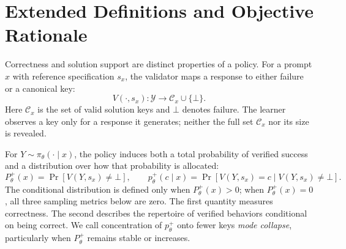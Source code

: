 \long{}

\section{Extended Definitions and Objective Rationale}
\label{app:metrics}

Correctness and solution support are distinct properties of a policy. For a
prompt $x$ with reference specification $s_x$, the validator maps a response
to either failure or a canonical key:
\[
  V(\cdot,s_x):\mathcal Y\rightarrow \mathcal C_x\cup\{\bot\}.
\]
Here $\mathcal C_x$ is the set of valid solution keys and $\bot$ denotes
failure. The learner observes a key only for a response it generates; neither
the full set $\mathcal C_x$ nor its size is revealed.

For $Y\sim\pi_\theta(\cdot\mid x)$, the policy induces both a total probability
of verified success and a distribution over how that probability is allocated:
\[
 P_\theta^+(x)=\Pr[V(Y,s_x)\neq\bot],
 \qquad
 p_\theta^+(c\mid x)=\Pr[V(Y,s_x)=c\mid V(Y,s_x)\neq\bot].
\]
The conditional distribution is defined only when $P_\theta^+(x)>0$;
when $P_\theta^+(x)=0$, all three sampling metrics below are zero.
The first quantity measures correctness. The second describes the repertoire
of verified behaviors conditional on being correct. We call concentration of
$p_\theta^+$ onto fewer keys \emph{mode collapse}, particularly when
$P_\theta^+$ remains stable or increases.

